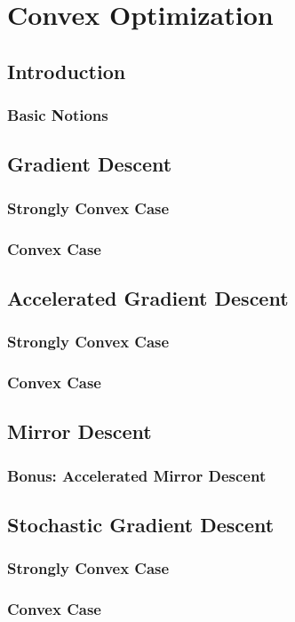 
\chapter{Convex Optimization}
\section{Introduction}
\subsection{Basic Notions}
\section{Gradient Descent}
\subsection{Strongly Convex Case}
\subsection{Convex Case}
\section{Accelerated Gradient Descent}
\subsection{Strongly Convex Case}
\subsection{Convex Case}
\section{Mirror Descent}
\subsection{Bonus: Accelerated Mirror Descent}
\section{Stochastic Gradient Descent}
\subsection{Strongly Convex Case}
\subsection{Convex Case}